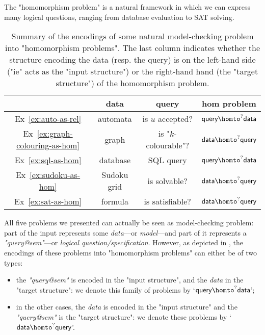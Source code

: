 \begin{known}
	The "homomorphism problem" is a natural framework in which we can express many
	logical questions, ranging from database evaluation to SAT solving.
\end{known}

\begin{table}
	\centering
	\begin{tabular}{cccc}
		\toprule 
		& data & query & hom problem \\ \midrule 
		Ex~\ref{ex:auto-as-rel} & automata & is $u$ accepted? & $\textsf{query} \homto^? \textsf{data}$ \\
		Ex~\ref{ex:graph-colouring-as-hom} & graph & is "$k$-colourable"?& $\textsf{data} \homto^? \textsf{query}$ \\
		Ex~\ref{ex:sql-as-hom} & database & SQL query & $\textsf{query} \homto^? \textsf{data}$ \\
		Ex~\ref{ex:sudoku-as-hom} & Sudoku grid & is solvable? & $\textsf{data} \homto^? \textsf{query}$ \\
		Ex~\ref{ex:sat-as-hom} & formula & is satisfiable? & $\textsf{data} \homto^? \textsf{query}$ \\ \bottomrule
	\end{tabular}
	\caption{\AP\label{tab:examples-encodings-in-hom}
		Summary of the encodings of some
		natural model-checking problem into "homomorphism problems".
		The last column indicates whether the structure encoding the data
		(resp. the query) is on the left-hand side ("ie" acts as the "input structure")
		or the right-hand hand (the "target structure")
		of the homomorphism problem.
	}
\end{table}

All five problems we presented can actually be seen as model-checking problem:
part of the input represents some \emph{data}---or \emph{model}---and part of it represents a
\emph{"query@sem"}---or \emph{logical question/specification}.
However, as depicted in , 
the encodings of these problems into "homomorphism problems" can either be of two types:
\begin{itemize}
	\item the \emph{"query@sem"} is encoded in the "input structure",
		and the \emph{data} in the "target structure": we denote
		this family of problems by `$\textsf{query} \homto^? \textsf{data}$';
	\item in the other cases, the \emph{data} is encoded in the "input structure"
		and the \emph{"query@sem"} is the "target structure": we denote
		these problems by `$\textsf{data} \homto^? \textsf{query}$'.
\end{itemize}

